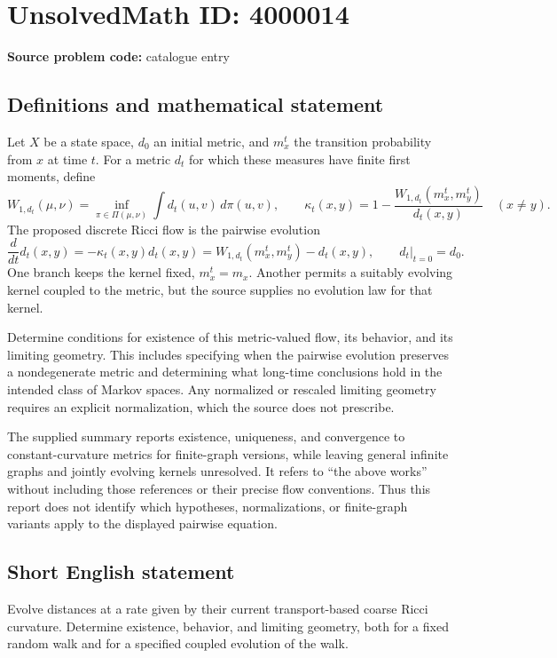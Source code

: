 \documentclass[11pt]{article}
\begin{document}
\section*{UnsolvedMath ID: 4000014}
\textbf{Source problem code:} catalogue entry
\subsection{Definitions and mathematical statement}
Let $X$ be a state space, $d_0$ an initial metric, and $m_x^t$ the transition probability from $x$ at time $t$. For a metric $d_t$ for which these measures have finite first moments, define
\[
W_{1,d_t}(\mu,\nu)=\inf_{\pi\in\Pi(\mu,\nu)}\int d_t(u,v)\,d\pi(u,v),\qquad
\kappa_t(x,y)=1-\frac{W_{1,d_t}(m_x^t,m_y^t)}{d_t(x,y)}\quad(x\ne y).
\]
The proposed discrete Ricci flow is the pairwise evolution
\[
\frac{d}{dt}d_t(x,y)=-\kappa_t(x,y)d_t(x,y)
=W_{1,d_t}(m_x^t,m_y^t)-d_t(x,y),\qquad d_t|_{t=0}=d_0.
\]
One branch keeps the kernel fixed, $m_x^t=m_x$. Another permits a suitably evolving kernel coupled to the metric, but the source supplies no evolution law for that kernel.

Determine conditions for existence of this metric-valued flow, its behavior, and its limiting geometry. This includes specifying when the pairwise evolution preserves a nondegenerate metric and determining what long-time conclusions hold in the intended class of Markov spaces. Any normalized or rescaled limiting geometry requires an explicit normalization, which the source does not prescribe.

The supplied summary reports existence, uniqueness, and convergence to constant-curvature metrics for finite-graph versions, while leaving general infinite graphs and jointly evolving kernels unresolved. It refers to ``the above works'' without including those references or their precise flow conventions. Thus this report does not identify which hypotheses, normalizations, or finite-graph variants apply to the displayed pairwise equation.
\subsection{Short English statement}
Evolve distances at a rate given by their current transport-based coarse Ricci curvature. Determine existence, behavior, and limiting geometry, both for a fixed random walk and for a specified coupled evolution of the walk.
\end{document}
